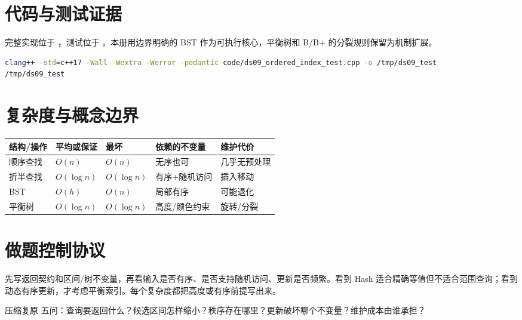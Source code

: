 \documentclass[UTF8,fontset=none,11pt,a4paper]{ctexart}
\begin{document}
\section{代码与测试证据}
完整实现位于 ，测试位于 。本册用边界明确的 BST 作为可执行核心，平衡树和 B/B+ 的分裂规则保留为机制扩展。


\begin{lstlisting}[language=bash]
clang++ -std=c++17 -Wall -Wextra -Werror -pedantic code/ds09_ordered_index_test.cpp -o /tmp/ds09_test
/tmp/ds09_test
\end{lstlisting}

\section{复杂度与概念边界}
\begin{center}\small
\begin{tabularx}{\linewidth}{L{2.5cm}C{1.8cm}C{1.8cm}YY}\toprule
结构/操作 & 平均或保证 & 最坏 & 依赖的不变量 & 维护代价\\\midrule
顺序查找 & $O(n)$ & $O(n)$ & 无序也可 & 几乎无预处理\\
折半查找 & $O(\log n)$ & $O(\log n)$ & 有序+随机访问 & 插入移动\\
BST & $O(h)$ & $O(n)$ & 局部有序 & 可能退化\\
平衡树 & $O(\log n)$ & $O(\log n)$ & 高度/颜色约束 & 旋转/分裂\\\bottomrule\end{tabularx}\end{center}

\section{做题控制协议}
先写返回契约和区间/树不变量，再看输入是否有序、是否支持随机访问、更新是否频繁。看到 Hash 适合精确等值但不适合范围查询；看到动态有序更新，才考虑平衡索引。每个复杂度都把高度或有序前提写出来。
\begin{corebox}{压缩复原}
五问：查询要返回什么？候选区间怎样缩小？秩序存在哪里？更新破坏哪个不变量？维护成本由谁承担？
\end{corebox}
\end{document}
